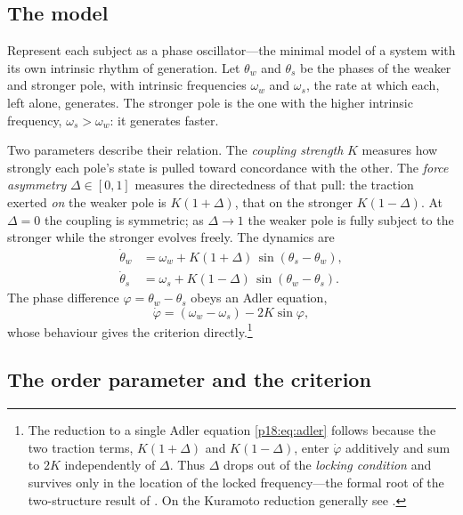 \subsection{The model}
\label{p18:sub:crit-model}

Represent each subject as a phase oscillator---the minimal model of a system with its own intrinsic rhythm of generation. Let $\theta_w$ and $\theta_s$ be the phases of the weaker and stronger pole, with intrinsic frequencies $\omega_w$ and $\omega_s$, the rate at which each, left alone, generates. The stronger pole is the one with the higher intrinsic frequency, $\omega_s>\omega_w$: it generates faster.

Two parameters describe their relation. The \emph{coupling strength} $K$ measures how strongly each pole's state is pulled toward concordance with the other. The \emph{force asymmetry} $\Delta\in[0,1]$ measures the directedness of that pull: the traction exerted \emph{on} the weaker pole is $K(1+\Delta)$, that on the stronger $K(1-\Delta)$. At $\Delta=0$ the coupling is symmetric; as $\Delta\to1$ the weaker pole is fully subject to the stronger while the stronger evolves freely. The dynamics are
\begin{align}
  \dot\theta_w &= \omega_w + K(1+\Delta)\,\sin(\theta_s-\theta_w),\\
  \dot\theta_s &= \omega_s + K(1-\Delta)\,\sin(\theta_w-\theta_s).
\end{align}
The phase difference $\varphi=\theta_w-\theta_s$ obeys an Adler equation,
\begin{equation}
  \dot\varphi = (\omega_w-\omega_s) - 2K\sin\varphi,
  \label{p18:eq:adler}
\end{equation}
whose behaviour gives the criterion directly.\footnote{The reduction to a single Adler equation \eqref{p18:eq:adler} follows because the two traction terms, $K(1+\Delta)$ and $K(1-\Delta)$, enter $\dot\varphi$ additively and sum to $2K$ independently of $\Delta$. Thus $\Delta$ drops out of the \emph{locking condition} and survives only in the location of the locked frequency---the formal root of the two-structure result of . On the Kuramoto reduction generally see \textcite{kuramoto1984}.}

\subsection{The order parameter and the criterion}
\label{p18:sub:crit-order}

